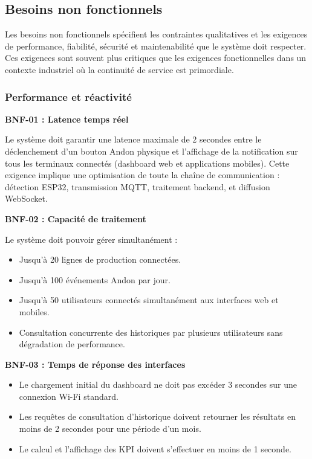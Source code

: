 \subsection{Besoins non fonctionnels}

Les besoins non fonctionnels spécifient les contraintes qualitatives et les exigences de performance, fiabilité, sécurité et maintenabilité que le système doit respecter. Ces exigences sont souvent plus critiques que les exigences fonctionnelles dans un contexte industriel où la continuité de service est primordiale.

\subsubsection{Performance et réactivité}

\textbf{BNF-01 : Latence temps réel}

Le système doit garantir une latence maximale de 2 secondes entre le déclenchement d'un bouton Andon physique et l'affichage de la notification sur tous les terminaux connectés (dashboard web et applications mobiles). Cette exigence implique une optimisation de toute la chaîne de communication : détection ESP32, transmission MQTT, traitement backend, et diffusion WebSocket.

\textbf{BNF-02 : Capacité de traitement}

Le système doit pouvoir gérer simultanément :
\begin{itemize}
    \item Jusqu'à 20 lignes de production connectées.
    \item Jusqu'à 100 événements Andon par jour.
    \item Jusqu'à 50 utilisateurs connectés simultanément aux interfaces web et mobiles.
    \item Consultation concurrente des historiques par plusieurs utilisateurs sans dégradation de performance.
\end{itemize}

\textbf{BNF-03 : Temps de réponse des interfaces}

\begin{itemize}
    \item Le chargement initial du dashboard ne doit pas excéder 3 secondes sur une connexion Wi-Fi standard.
    \item Les requêtes de consultation d'historique doivent retourner les résultats en moins de 2 secondes pour une période d'un mois.
    \item Le calcul et l'affichage des KPI doivent s'effectuer en moins de 1 seconde.
\end{itemize}

